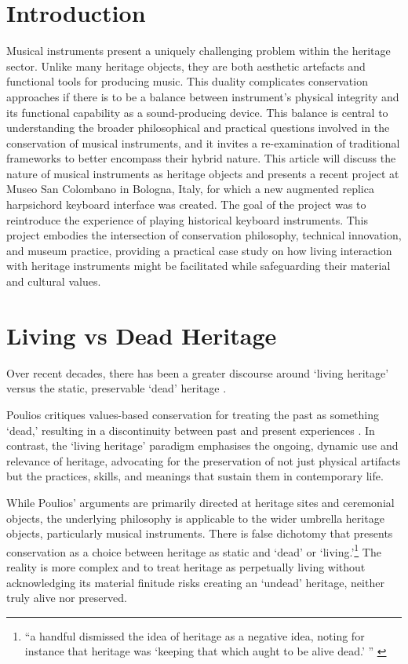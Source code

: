 \section{Introduction}

Musical instruments present a uniquely challenging problem within the heritage sector. Unlike many heritage objects, they are both aesthetic artefacts and functional tools for producing music. This duality complicates conservation approaches if there is to be a balance between instrument's physical integrity and its functional capability as a sound-producing device. This balance is central to understanding the broader philosophical and practical questions involved in the conservation of musical instruments, and it invites a re-examination of traditional frameworks to better encompass their hybrid nature. This article will discuss the nature of musical instruments as heritage objects and presents a recent project at Museo San Colombano in Bologna, Italy, for which a new augmented replica harpsichord keyboard interface was created. The goal of the project was to reintroduce the experience of playing historical keyboard instruments. This project embodies the intersection of conservation philosophy, technical innovation, and museum practice, providing a practical case study on how living interaction with heritage instruments might be facilitated while safeguarding their material and cultural values.

\section{Living vs Dead Heritage}

Over recent decades, there has been a greater discourse around `living heritage' versus the static, preservable `dead' heritage \cite{poulios_moving_2010,smith_uses_2006}. 

Poulios critiques values-based conservation for treating the past as something `dead,' resulting in a discontinuity between past and present experiences \cite{poulios_moving_2010}. In contrast, the `living heritage' paradigm emphasises the ongoing, dynamic use and relevance of heritage, advocating for the preservation of not just physical artifacts but the practices, skills, and meanings that sustain them in contemporary life.

While Poulios' arguments are primarily directed at heritage sites and ceremonial objects, the underlying philosophy is applicable to the wider umbrella heritage objects, particularly musical instruments. There is false dichotomy that presents conservation as a choice between heritage as static and `dead' or `living.'\footnote{``a handful dismissed the idea of heritage as a negative idea, noting for instance that heritage was `keeping that which aught to be alive dead.' '' \cite{smith_uses_2006}}
The reality is more complex and to treat heritage as perpetually living without acknowledging its material finitude risks creating an `undead' heritage, neither truly alive nor preserved.

